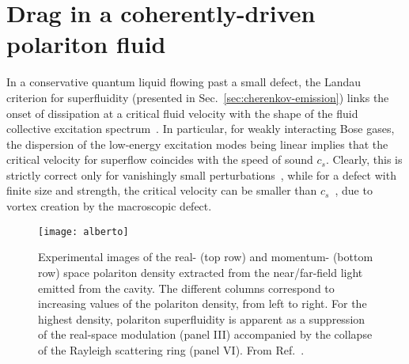 

\chapter{Drag in a coherently-driven polariton fluid}
\label{cha:drag}

In a conservative quantum liquid flowing past a small defect, the
Landau criterion for superfluidity (presented in
Sec.~\ref{sec:cherenkov-emission}) links the onset of dissipation at a
critical fluid velocity with the shape of the fluid collective
excitation spectrum~\cite{9780198507192}. In particular, for weakly
interacting Bose gases, the dispersion of the low-energy excitation
modes being linear implies that the critical velocity for superflow
coincides with the speed of sound $c_s$. Clearly, this is strictly
correct only for vanishingly small
perturbations~\cite{Astrakharchik_2004}, while for a defect with
finite size and strength, the critical velocity can be smaller than
$c_s$~\cite{Onofrio_2000,Ianeselli_2006}, due to vortex creation by
the macroscopic defect.
%
\begin{figure}[tb]\centering
  \texttt{[image: alberto]}
  \caption{
    Experimental images of the real- (top row) and momentum- (bottom
    row) space polariton density extracted from the near/far-field light
    emitted from the cavity. The different columns correspond to
    increasing values of the polariton density, from left to right. For
    the highest density, polariton superfluidity is apparent as a
    suppression of the real-space modulation (panel III) accompanied by
    the collapse of the Rayleigh scattering ring (panel VI).
    From Ref.~\cite{Amo_2009}.
  }\label{fig:alberto}
\end{figure}
% 

